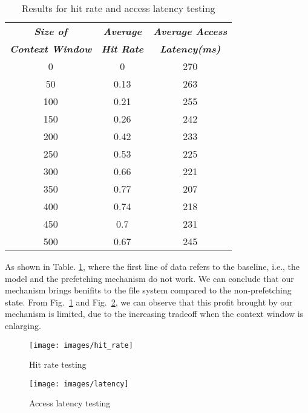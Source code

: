 \documentclass[conference]{IEEEtran}
\begin{document}
\begin{table}[htbp]
    \caption{Results for hit rate and access latency testing} 
\begin{center}
    \begin{tabular}{ |c|c|c| } 
     \hline
     \textbf{\textit{Size of}}&\textbf{\textit{Average}} &\textbf{\textit{Average Access}}\\ 
     \textbf{\textit{Context Window}}& \textbf{\textit{Hit Rate}} & \textbf{\textit{Latency(ms)}}\\
     \hline
     \hline
     0	&0	&270\\
     \hline
     50	&0.13	&263\\
     \hline
     100	&0.21	&255\\
     \hline
     150	&0.26	&242\\
     \hline
     200	&0.42	&233\\
     \hline
     250	&0.53	&225\\
     \hline
     300	&0.66	&221\\
     \hline
     350	&0.77	&207\\
     \hline
     400	&0.74	&218\\
     \hline
     450	&0.7	&231\\
     \hline
     500	&0.67	&245\\
     \hline
    \end{tabular}
\end{center}

    \label{table:result}
\end{table}
As shown in Table. \ref{table:result}, where the first line of data refers to the baseline, i.e., the model and the prefetching mechanism do not work. We can conclude that our mechanism brings benifits to the file system compared to the non-prefetching state. From Fig.~\ref{fig:hit_rate} and Fig.~\ref{fig:latency}, we can observe that this profit brought by our mechanism is limited, due to the increasing tradeoff when the context window is enlarging.
\begin{figure}
\centering
\texttt{[image: images/hit\_rate]}
\caption{Hit rate testing}
\label{fig:hit_rate}
\end{figure}

\begin{figure}
\centering
\texttt{[image: images/latency]}
\caption{Access latency testing}
\label{fig:latency}
\end{figure}
\end{document}
